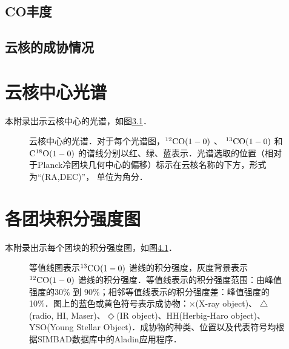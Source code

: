 \documentclass[UTF8, nocolorlinks]{pkuthss}
\newcommand{\coaa}{$\rm^{12}CO(1-0)$ }
\newcommand{\cobb}{$\rm^{13}CO(1-0)$ }
\newcommand{\cocc}{$\rm C^{18}O(1-0)$ }
\begin{document}
		

	\section{CO丰度}
	\section{云核的成协情况}

\appendix %

\printbibliography[heading = bibintoc]

\chapter{云核中心光谱}\label{App.Spectra}
	本附录出示云核中心的光谱，如图\ref{Fig.Spectra}．

	\begin{figure}[h]
		\caption{云核中心的光谱．对于每个光谱图，\coaa 、 \cobb 和 \cocc   的谱线分别以红、绿、蓝表示．光谱选取的位置（相对于Planck冷团块几何中心的偏移）标示在云核名称的下方，形式为“(RA,DEC)”， 单位为角分．\label{Fig.Spectra}}
	\end{figure}
		\vspace{-18mm}

\chapter{各团块积分强度图}\label{App.Map}
	
	本附录出示每个团块的积分强度图，如图\ref{Fig.Map}．

	\begin{figure}[h]
		\caption{等值线图表示\cobb 谱线的积分强度，灰度背景表示\coaa 谱线的积分强度．等值线表示的积分强度范围：由峰值强度的30\% 到 90\%；相邻等值线表示的积分强度差：峰值强度的10\%．图上的蓝色或黄色符号表示成协物：$\times$(X-ray object)、 $\triangle$(radio, {HI}, Maser)、$\Diamond$(IR object)、HH(Herbig-Haro object)、YSO(Young Stellar Object)．成协物的种类、位置以及代表符号均根据SIMBAD数据库中的Aladin应用程序．\label{Fig.Map}}
	\end{figure}
		\vspace{-18mm}

\backmatter


\end{document}
